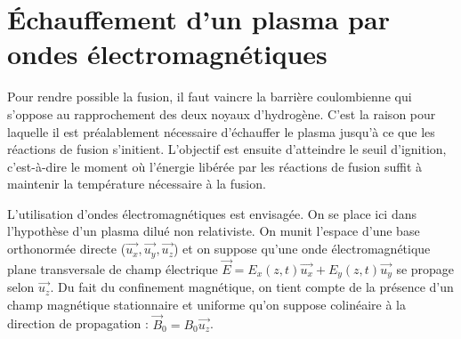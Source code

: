 \section{Échauffement d'un plasma par ondes électromagnétiques}
Pour rendre possible la fusion, il faut vaincre la barrière coulombienne qui s'oppose au rapprochement des deux noyaux d'hydrogène. C'est la raison pour laquelle il est préalablement nécessaire d'échauffer le plasma jusqu'à ce que les réactions de fusion s'initient. L'objectif est ensuite d'atteindre le seuil d'ignition, c'est-à-dire le moment où l'énergie libérée par les réactions de fusion suffit à maintenir la température nécessaire à la fusion.

L'utilisation d'ondes électromagnétiques est envisagée. On se place ici dans l'hypothèse d'un plasma dilué non relativiste. On munit l'espace d'une base orthonormée directe (\(\overrightarrow{u_{x}}, \overrightarrow{u_{y}}, \overrightarrow{u_{z}}\)) et on suppose qu'une onde électromagnétique plane transversale de champ électrique \(\vec{E}=E_{x}(z, t) \overrightarrow{u_{x}}+E_{y}(z, t) \overrightarrow{u_{y}}\) se propage selon \(\overrightarrow{u_{z}}\). Du fait du confinement magnétique, on tient compte de la présence d'un champ magnétique stationnaire et uniforme qu'on suppose colinéaire à la direction de propagation : \(\vec{B}_{0}=B_{0} \overrightarrow{u_{z}}\).
